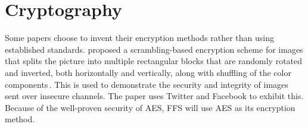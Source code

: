 \section{Cryptography}
\label{sec:rel_crypto}
Some papers choose to invent their encryption methods rather than using established standards. \citeauthor{chumanEncryptionThenCompressionSystemsUsing2019} proposed a \mbox{scrambling-based} encryption scheme for images that splits the picture into multiple rectangular blocks that are randomly rotated and inverted, both horizontally and vertically, along with shuffling of the color components\,\cite{chumanEncryptionThenCompressionSystemsUsing2019}. This is used to demonstrate the security and integrity of images sent over insecure channels. The paper uses Twitter and Facebook to exhibit this. Because of the \mbox{well-proven} security of \gls{AES}, \gls{FFS} will use \gls{AES} as its encryption method.